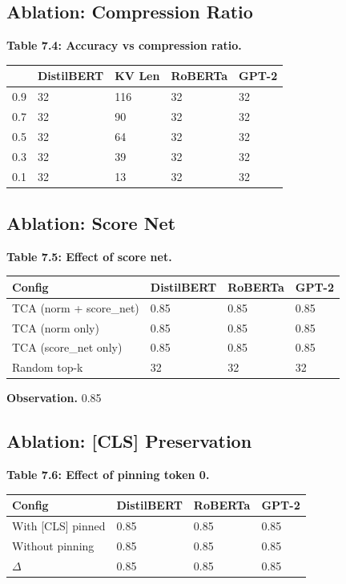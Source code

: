 \subsection{Ablation: Compression Ratio}

\textbf{Table 7.4: Accuracy vs compression ratio.}

\begin{table}[H]
\centering
\small
\begin{tabular}{lllll}
\toprule
\textbf{} & \textbf{DistilBERT} & \textbf{KV Len} & \textbf{RoBERTa} & \textbf{GPT-2} \\
\midrule
0.9 & 32 & 116 & 32 & 32 \\
0.7 & 32 & 90 & 32 & 32 \\
0.5 & 32 & 64 & 32 & 32 \\
0.3 & 32 & 39 & 32 & 32 \\
0.1 & 32 & 13 & 32 & 32 \\
\bottomrule
\end{tabular}
\end{table}

\subsection{Ablation: Score Net}

\textbf{Table 7.5: Effect of score net.}

\begin{table}[H]
\centering
\small
\begin{tabular}{llll}
\toprule
\textbf{Config} & \textbf{DistilBERT} & \textbf{RoBERTa} & \textbf{GPT-2} \\
\midrule
TCA (norm + score\_net) & 0.85 & 0.85 & 0.85 \\
TCA (norm only) & 0.85 & 0.85 & 0.85 \\
TCA (score\_net only) & 0.85 & 0.85 & 0.85 \\
Random top-k & 32 & 32 & 32 \\
\bottomrule
\end{tabular}
\end{table}

\textbf{Observation.} 0.85

\subsection{Ablation: [CLS] Preservation}

\textbf{Table 7.6: Effect of pinning token 0.}

\begin{table}[H]
\centering
\small
\begin{tabular}{llll}
\toprule
\textbf{Config} & \textbf{DistilBERT} & \textbf{RoBERTa} & \textbf{GPT-2} \\
\midrule
With [CLS] pinned & 0.85 & 0.85 & 0.85 \\
Without pinning & 0.85 & 0.85 & 0.85 \\
$\Delta$ & 0.85 & 0.85 & 0.85 \\
\bottomrule
\end{tabular}
\end{table}

